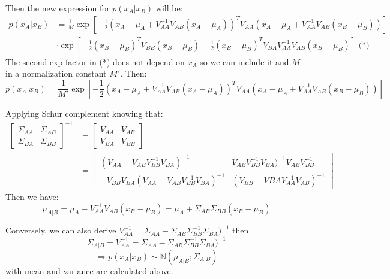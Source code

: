 \documentclass[a4paper, 10pt]{article}  %
\begin{document}
\begin{enumerate}[label=\textbf{(\alph*)}]
    Then the new expression for $p(x_A | x_B)$ will be:
    \begin{align*}
        p(x_A | x_B) &= \frac{1}{M} \exp \left[ -\frac{1}{2} (x_A - \mu_A + V_{AA}^{-1} V_{AB} (x_A - \mu_A))^T V_{AA}  (x_A - \mu_A + V_{AA}^{-1} V_{AB} (x_B - \mu_B))\right] \\
        & \cdot \exp \left[ -\frac{1}{2}(x_B - \mu_B)^T V_{BB} (x_B - \mu_B) + \frac{1}{2}(x_B - \mu_B)^T V_{BA} V_{AA}^{-1} V_{AB} (x_B - \mu_B) \right] \text{ (*)}
    \end{align*}
    The second exp factor in (*) does not depend on $x_A$ so we can include it and $M$ in a normalization constant $M'$. Then:
    \[p(x_A | x_B) = \frac{1}{M'} \exp \left[ -\frac{1}{2} (x_A - \mu_A + V_{AA}^{-1} V_{AB} (x_A - \mu_A))^T V_{AA}  (x_A - \mu_A + V_{AA}^{-1} V_{AB} (x_B - \mu_B))\right]\]
    
    Applying Schur complement knowing that:
    \begin{align*}
        \left[ \begin{array}{cc}
            \Sigma_{AA} & \Sigma_{AB} \\
            \Sigma_{BA} & \Sigma_{BB}
        \end{array} \right]^{-1} 
        & = \left[ \begin{array}{cc}
        V_{AA} & V_{AB} \\
        V_{BA} & V_{BB} \end{array} \right] \\
        &= \left[ \begin{array}{cc}
            (V_{AA} - V_{AB} V_{BB}^{-1} V_{BA})^{-1} &  V_{AB} V_{BB}^{-1} V_{BA})^{-1} V_{AB} V_{BB}^{-1}\\
            - V_{BB} V_{BA}(V_{AA} - V_{AB} V_{BB}^{-1} V_{BA})^{-1} & (V_{BB} - V{BA} V_{AA}^{-1}V_{AB})^{-1}
        \end{array} \right]
    \end{align*}
    Then we have:
    \[\mu_{A|B} = \mu_A - V_{AA}^{-1} V_{AB} (x_B - \mu_B) = \mu_A + \Sigma_{AB} \Sigma_{BB}(x_B - \mu_B) \]
    
    Conversely, we can also derive \(V_{AA}^{-1} = \Sigma_{AA} - \Sigma_{AB} \Sigma_{BB}^{-1} \Sigma_{BA})^{-1}\) then \[\Sigma_{A|B} = V_{AA}^{-1} = \Sigma_{AA} - \Sigma_{AB} \Sigma_{BB}^{-1} \Sigma_{BA})^{-1}\]
    \[\Rightarrow p(x_A | x_B) \sim \mathbb{N} (\mu_{A|B}; \Sigma_{A|B})\] with mean and variance are calculated above.
\end{enumerate}
\end{document}
